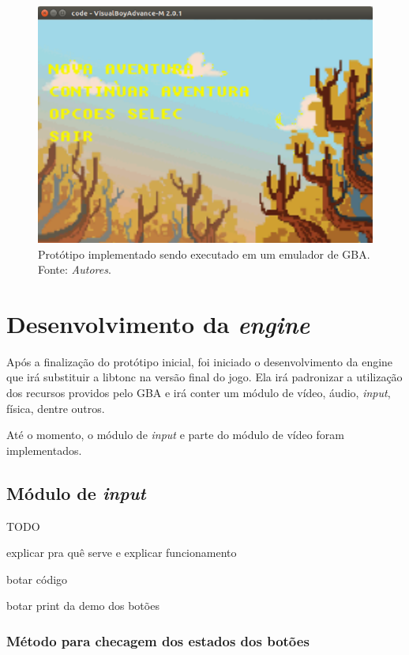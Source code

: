 \begin{figure}[H]
 \centering \includegraphics[keepaspectratio=true,scale=0.6]{figuras/tw-gba-1.eps}
   \caption{Protótipo implementado sendo executado em um emulador de GBA. Fonte: \textit{Autores}.}
   \label{tw-gba-1}
\end{figure}

\section{Desenvolvimento da \textit{engine}}

Após a finalização do protótipo inicial, foi iniciado o desenvolvimento da engine que irá substituir a libtonc na versão final do jogo. Ela irá padronizar a utilização dos recursos providos pelo GBA e irá conter um módulo de vídeo, áudio, \textit{input}, física, dentre outros.

Até o momento, o módulo de \textit{input} e parte do módulo de vídeo foram implementados.

\subsection{Módulo de \textit{input}}

  TODO

  explicar pra quê serve e explicar funcionamento

  botar código

  botar print da demo dos botões

  \subsubsection{Método para checagem dos estados dos botões}

